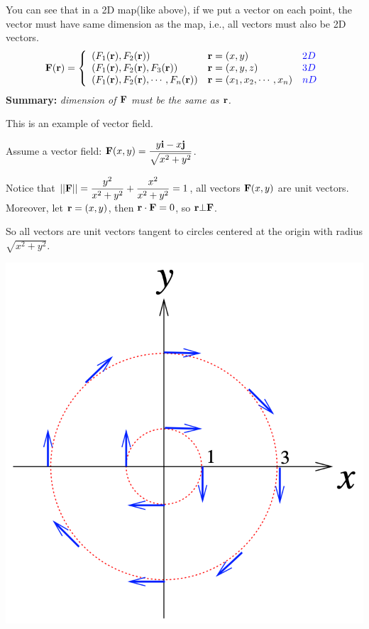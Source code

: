 \begin{spacing}{1.3}
    You can see that in a 2D map(like above), if we put a vector on each point, the vector must have 
    same dimension as the map, i.e., all vectors must also be 2D vectors.
    $${\bf F(r)}=\left\{
        \begin{array}{lll}
            (F_1({\bf r}), F_2({\bf r})) & {\bf r}=(x,y) & {\color{blue} 2D}\\
            (F_1({\bf r}), F_2({\bf r}), F_3({\bf r})) & {\bf r}=(x,y,z) & {\color{blue} 3D}\\
            (F_1({\bf r}), F_2({\bf r}), \cdots, F_n({\bf r})) & {\bf r}=(x_1, x_2,\cdots, x_n) & {\color{blue} nD}
        \end{array}\right.$$
    {\bf Summary:} {\it dimension of ${\bf F}$ must be the same as ${\bf r}$.}

    \vspace{0.3in}
    {\blue This is an example of vector field.}

    \eg Assume a vector field: ${\bf F}(x,y)=\dfrac{y{\bf i} -x{\bf j}}{\sqrt{x^2+y^2}}$.

    \sol Notice that $||{\bf F}||=\dfrac{y^2}{x^2+y^2}+\dfrac{x^2}{x^2+y^2}=1$, all vectors 
    ${\bf F}(x,y)$ are unit vectors. Moreover, let ${\bf r}=(x,y)$, then ${\bf r}\cdot {\bf F}=0$,
    so ${\bf r}\bot {\bf F}$.

    So all vectors are unit vectors tangent to circles centered at the origin with radius $\sqrt{x^2+y^2}$.
    \begin{center}
        \includegraphics[scale=0.36]{images/Ch15-ex1.2.png}
    \end{center}


\end{spacing}
